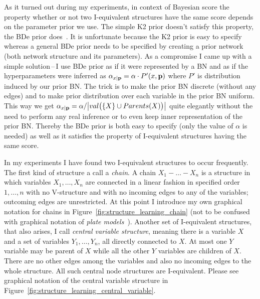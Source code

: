 \documentclass[english,cover]{fitthesis} %
\newcommand{\term}[1]{\emph{#1}}           %
\newcommand{\vars}[1]{{\bold{#1}}}         %
\begin{document}
As it turned out during my experiments, in context of Bayesian score the property whether or not two I-equivalent structures have the same score depends on the parameter prior we use. The simple K2 prior doesn't satisfy this property, the BDe prior does~\cite[p.~807]{pgm}. It is unfortunate because the K2 prior is easy to specify whereas a general BDe prior needs to be specified by creating a prior network (both network structure and its parameters). As a compromise I came up with a simple solution\,--\,I use BDe prior as if it were represented by a BN and as if the hyperparameters were inferred as $\alpha_{x \mid \vars{p}} = \alpha \cdot P'(x, \vars{p})$ where $P'$ is distribution induced by our prior BN. The trick is to make the prior BN discrete (without any edges) and to make prior distribution over each variable in the prior BN uniform. This way we get $\alpha_{x \mid \vars{p}} = \alpha / \bigl | val \bigl(\lbrace X \rbrace \cup Parents(X) \bigr) \bigr |$ quite elegantly without the need to perform any real inference or to even keep inner representation of the prior BN. Thereby the BDe prior is both easy to specify (only the value of $\alpha$ is needed) as well as it satisfies the property of I-equivalent structures having the same score.

\medskip
In my experiments I have found two I-equivalent structures to occur frequently. The first kind of structure a call a \term{chain}. A chain $X_1 - \dots - X_n$ is a structure in which variables $X_1, \dots, X_n$ are connected in a linear fashion in specified order $1,\dots,n$ with no V-structure and with no incoming edges to any of the variables; outcoming edges are unrestricted. At this point I introduce my own graphical notation for chains in Figure~\ref{fig:structure_learning_chain} (not to be confused with graphical notation of \term{plate models}~\cite{pgm}). Another set of I-equivalent structures, that also arises, I call \term{central variable structure}, meaning there is a  variable $X$ and a set of variables $Y_1,\dots,Y_n$, all directly connected to $X$. At most one $Y$ variable may be parent of $X$ while all the other $Y$ variables are children of $X$. There are no other edges among the variables and also no incoming edges to the whole structure. All such central node structures are I-equivalent. Please see graphical notation of the central variable structure in Figure~\ref{fig:structure_learning_central_variable}.
\end{document}
